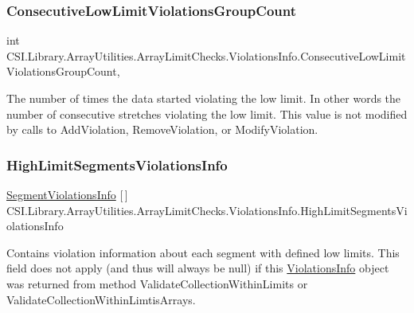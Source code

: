 \subsubsection{\texorpdfstring{ConsecutiveLowLimitViolationsGroupCount}{ConsecutiveLowLimitViolationsGroupCount}}
{\footnotesize\ttfamily int C\+S\+I.\+Library.\+Array\+Utilities.\+Array\+Limit\+Checks.\+Violations\+Info.\+Consecutive\+Low\+Limit\+Violations\+Group\+Count\hspace{0.3cm}{\ttfamily [get]}, {\ttfamily [set]}}



The number of times the data started violating the low limit. In other words the number of consecutive stretches violating the low limit. This value is not modified by calls to Add\+Violation, Remove\+Violation, or Modify\+Violation. 

\mbox{\label{struct_c_s_i_1_1_library_1_1_array_utilities_1_1_array_limit_checks_1_1_violations_info_a0f7bee22ee490d5687371c2301096d13}} 
\subsubsection{\texorpdfstring{HighLimitSegmentsViolationsInfo}{HighLimitSegmentsViolationsInfo}}
{\footnotesize\ttfamily \mbox{\hyperlink{class_c_s_i_1_1_library_1_1_array_utilities_1_1_array_limit_checks_1_1_segment_violations_info}{Segment\+Violations\+Info}} \mbox{[}$\,$\mbox{]} C\+S\+I.\+Library.\+Array\+Utilities.\+Array\+Limit\+Checks.\+Violations\+Info.\+High\+Limit\+Segments\+Violations\+Info\hspace{0.3cm}{\ttfamily [get]}}



Contains violation information about each segment with defined low limits. This field does not apply (and thus will always be null) if this \mbox{\hyperlink{struct_c_s_i_1_1_library_1_1_array_utilities_1_1_array_limit_checks_1_1_violations_info}{Violations\+Info}} object was returned from method Validate\+Collection\+Within\+Limits or Validate\+Collection\+Within\+Limtis\+Arrays. 

